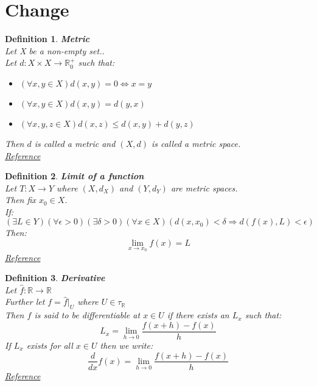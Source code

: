 \documentclass[12pt]{extarticle}
\theoremstyle{plain}
\theoremstyle{plain}
\theoremstyle{Definition}
\newtheorem{def.}{Definition}[section]
\theoremstyle{Definition}
\theoremstyle{plain}
\begin{document}
\section{Change}
\begin{def.} \textbf{Metric} \\ 
	Let X be a non-empty set.. \\ 
	Let $d : X \times X \to \mathbb{R}^+_0$ such that: 
	\begin{itemize}
		\item $(\forall x,y \in X) d(x,y) = 0 \Leftrightarrow x = y$ 
		\item $(\forall x,y \in X) d(x,y) = d(y,x)$
		\item $(\forall x,y,z \in X) d(x,z) \leq d(x,y) + d(y,z)$
	\end{itemize}	
	Then $d$ is called a metric and $(X,d)$ is called a metric space. \\
	\href{https://en.wikipedia.org/wiki/Metric_space}{Reference}
\end{def.}
\begin{def.} \textbf{Limit of a function} \\ 
	Let $T : X \to Y$ where $(X,d_X)$ and $(Y,d_Y)$ are metric spaces. \\ 
	Then fix $x_0 \in X$. \\
	If:
	$$(\exists L \in Y)( \forall \epsilon > 0 )(\exists \delta > 0)(\forall x \in X)(d(x,x_0) < \delta \Rightarrow d(f(x),L) < \epsilon)$$
	Then: $$\lim_{x \to x_0} f(x) = L$$ 
	\href{https://en.wikipedia.org/wiki/Limit_of_a_function}{Reference}
\end{def.}
\begin{def.} \textbf{Derivative} \\ 
	Let $\hat{f} : \mathbb{R} \to \mathbb{R}$ \\ 
	Further let $f = \hat{f}|_U$ where $U \in \tau_\mathbb{R}$ \\ 
	Then $f$ is said to be differentiable at $x \in U$ if there exists an $L_x$ such that: \\ 
	$$L_x = \lim_{h \to 0} \frac{f(x + h) - f(x)}{h}$$
	If $L_x$ exists for all $x \in U$ then we write: \\ 
	$$\frac{d}{dx}f(x) = \lim_{h \to 0} \frac{f(x + h) - f(x)}{h}$$
	\href{https://en.wikipedia.org/wiki/Differentiable_function}{Reference}
\end{def.}
\end{document}
